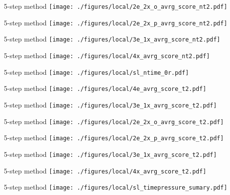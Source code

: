 \documentclass[hyperref={pdfpagelabels=false}]{beamer}
\begin{document}
\begin{frame}{5-step method}
\texttt{[image: ./figures/local/2e\_2x\_o\_avrg\_score\_nt2.pdf]}
\end{frame}

\begin{frame}{5-step method}
\texttt{[image: ./figures/local/2e\_2x\_p\_avrg\_score\_nt2.pdf]}
\end{frame}

\begin{frame}{5-step method}
\texttt{[image: ./figures/local/3e\_1x\_avrg\_score\_nt2.pdf]}
\end{frame}

\begin{frame}{5-step method}
\texttt{[image: ./figures/local/4x\_avrg\_score\_nt2.pdf]}
\end{frame}


\begin{frame}{5-step method}
\texttt{[image: ./figures/local/sl\_ntime\_0r.pdf]}
\end{frame}

\begin{frame}{5-step method}
\texttt{[image: ./figures/local/4e\_avrg\_score\_t2.pdf]}
\end{frame}

\begin{frame}{5-step method}
\texttt{[image: ./figures/local/3e\_1x\_avrg\_score\_t2.pdf]}
\end{frame}

\begin{frame}{5-step method}
\texttt{[image: ./figures/local/2e\_2x\_o\_avrg\_score\_t2.pdf]}
\end{frame}

\begin{frame}{5-step method}
\texttt{[image: ./figures/local/2e\_2x\_p\_avrg\_score\_t2.pdf]}
\end{frame}

\begin{frame}{5-step method}
\texttt{[image: ./figures/local/3e\_1x\_avrg\_score\_t2.pdf]}
\end{frame}

\begin{frame}{5-step method}
\texttt{[image: ./figures/local/4x\_avrg\_score\_t2.pdf]}
\end{frame}

\begin{frame}{5-step method}
\texttt{[image: ./figures/local/sl\_timepressure\_sumary.pdf]}
\end{frame}
\end{document}
